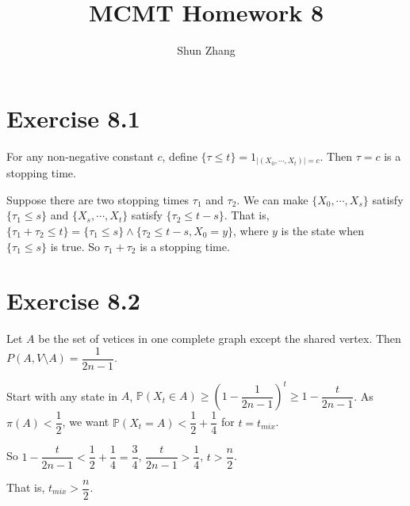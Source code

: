 \documentclass[10pt]{article}
\title{MCMT Homework 8}
\author{Shun Zhang}
\date{}
\renewcommand{\P}{\mathbb{P}}
\begin{document}
\maketitle

\section*{Exercise 8.1}

For any non-negative constant $c$, define $\{\tau \leq t\} = 1_{|(X_0, \cdots,
X_t)| = c}$.  Then $\tau = c$ is a stopping time.

Suppose there are two stopping times $\tau_1$ and $\tau_2$.
We can make $\{X_0, \cdots, X_s\}$ satisfy $\{\tau_1 \leq s\}$ and $\{X_{s},
\cdots, X_t\}$ satisfy $\{\tau_2 \leq t - s\}$.
That is, $\{\tau_1 + \tau_2 \leq t\} = \{\tau_1 \leq s\} \land \{\tau_2 \leq t -
s, X_0 = y\}$, where $y$ is the state when $\{\tau_1 \leq s\}$ is true.
So $\tau_1 + \tau_2$ is a stopping time.

\section*{Exercise 8.2}

Let $A$ be the set of vetices in one complete graph except the shared vertex.
Then $P(A, V \setminus A) = \dfrac{1}{2n-1}$.

Start with any state in $A$,
$\P(X_t \in A) \geq (1 - \dfrac{1}{2n-1})^t \geq 1 - \dfrac{t}{2n-1}$.
As $\pi(A) < \dfrac{1}{2}$, we want $\P(X_t = A) < \dfrac{1}{2} +
\dfrac{1}{4}$ for $t = t_{mix}$.

So $1 - \dfrac{t}{2n-1} < \dfrac{1}{2} + \dfrac{1}{4} = \dfrac{3}{4}$,
$\dfrac{t}{2n-1} > \dfrac{1}{4}$,
$t > \dfrac{n}{2}$.

That is, $t_{mix} > \dfrac{n}{2}$.
\end{document}
